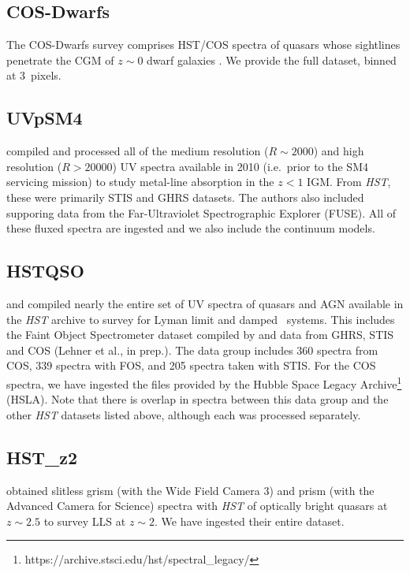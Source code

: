 \documentclass[12pt]{elsarticle}
\begin{document}
\subsection{COS-Dwarfs}
\label{sec:cos-dwarfs}

The COS-Dwarfs survey comprises HST/COS spectra
of quasars whose sightlines penetrate the CGM of
$z \sim 0$ dwarf galaxies \citep{bordoloi14}.
We provide the full dataset, binned at 3~pixels.

\subsection{UVpSM4}
\label{sec:hstmetals}

\cite{ctp+10,cpt+11} compiled and processed all of the medium
resolution ($R \sim 2000$) and high resolution
($R > 20000$) UV spectra available in 2010 
(i.e.\ prior to the SM4 servicing mission)
to study metal-line absorption in the $z<1$ IGM.
From {\it HST}, these were primarily STIS and
GHRS datasets.  The authors also included
supporing data from the Far-Ultraviolet Spectrographic 
Explorer (FUSE).
All of these fluxed spectra are ingested and we
also include the \cite{ctp+10} continuum models.

\subsection{HSTQSO}
\label{sec:hstqso}

\cite{ribaudo11} and \cite{neeleman+16}
compiled nearly the entire set of UV spectra of 
quasars and AGN available in the {\it HST} archive
to survey for Lyman limit and damped \lya\ systems.
This includes the Faint Object Spectrometer dataset
compiled by \cite{bechtold02} and data from GHRS,
STIS and COS (Lehner et al., in prep.).
The data group includes 360 spectra from COS,
339 spectra with FOS, and 205 spectra taken
with STIS.  For the COS spectra, we have ingested
the files provided by the Hubble Space Legacy 
Archive\footnote{https://archive.stsci.edu/hst/spectral\_legacy/}
(HSLA).
Note that there is overlap in spectra
between this data group and
the other {\it HST} datasets listed above, although
each was processed separately.

\subsection{HST\_z2}
\label{sec:hstz2}

\cite{omeara11,omeara13} obtained slitless grism
(with the Wide Field Camera 3) and prism (with the
Advanced Camera for Science) spectra with {\it HST}
of optically bright quasars at $z \sim 2.5$
to survey LLS at $z \sim 2$.  
We have ingested their entire dataset.
\end{document}
